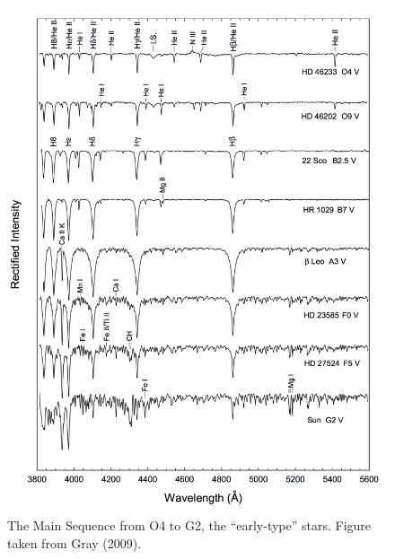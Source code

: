 \documentclass[a4paper,10pt]{article}
\begin{document}
\begin{figure}[h]
    \centering
    \includegraphics[width=14cm]{figures/StellarSpectra_OG.png}
    \caption{\footnotesize{The Main Sequence from O4 to G2, the ``early-type'' stars. Figure taken from Gray (2009).}}
    \label{fig:stellarspec_og}
\end{figure}
\end{document}

